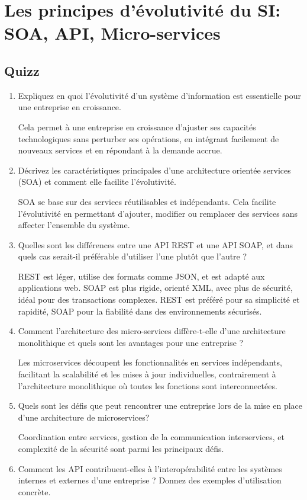 \chapter{Les principes d'évolutivité du SI: SOA, API, Micro-services}

\section*{Quizz}

\begin{enumerate}
    \item Expliquez en quoi l’évolutivité d’un système d’information est essentielle pour une entreprise en croissance.

        Cela permet à une entreprise en croissance d’ajuster ses capacités technologiques sans perturber ses opérations, en intégrant facilement de nouveaux services et en répondant à la demande accrue.
    \item Décrivez les caractéristiques principales d'une architecture orientée services (SOA) et comment elle facilite l'évolutivité.

        SOA se base sur des services réutilisables et indépendants. Cela facilite l’évolutivité en permettant d'ajouter, modifier ou remplacer des services sans affecter l'ensemble du système.
    \item Quelles sont les différences entre une API REST et une API SOAP, et dans quels cas serait-il préférable d’utiliser l'une plutôt que l’autre ?

        REST est léger, utilise des formats comme JSON, et est adapté aux applications web. SOAP est plus rigide, orienté XML, avec plus de sécurité, idéal pour des transactions complexes. REST est préféré pour sa simplicité et rapidité, SOAP pour la fiabilité dans des environnements sécurisés.
    \item Comment l’architecture des micro-services diffère-t-elle d’une architecture monolithique et quels sont les avantages pour une entreprise ?

        Les microservices découpent les fonctionnalités en services indépendants, facilitant la scalabilité et les mises à jour individuelles, contrairement à l’architecture monolithique où toutes les fonctions sont interconnectées.
    \item Quels sont les défis que peut rencontrer une entreprise lors de la mise en place d’une architecture de microservices?

        Coordination entre services, gestion de la communication interservices, et complexité de la sécurité sont parmi les principaux défis.
    \item Comment les API contribuent-elles à l’interopérabilité entre les systèmes internes et externes d’une entreprise ? Donnez des exemples d’utilisation concrète.


\end{enumerate}

